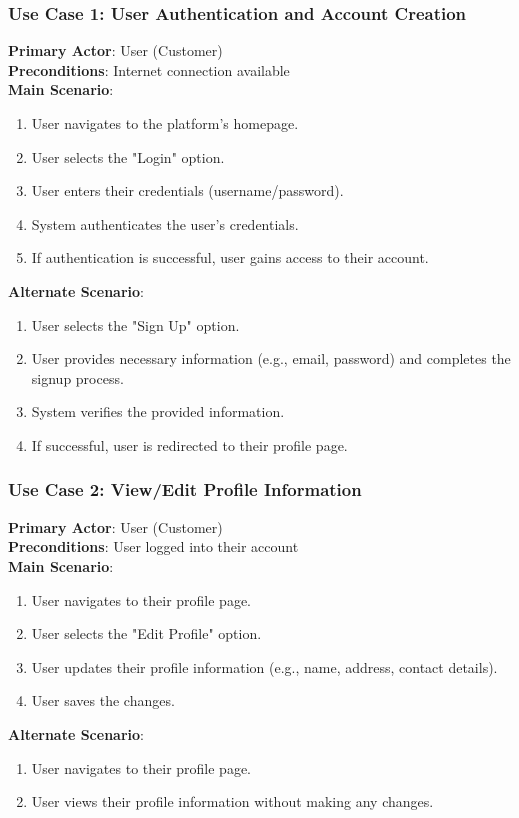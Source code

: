 \documentclass{article}
\begin{document}
\subsubsection{Use Case 1: User Authentication and Account Creation}
\textbf{Primary Actor}: User (Customer) \\
\textbf{Preconditions}: Internet connection available \\
\textbf{Main Scenario}:
\begin{enumerate}
    \item User navigates to the platform's homepage.
    \item User selects the "Login" option.
    \item User enters their credentials (username/password).
    \item System authenticates the user's credentials.
    \item If authentication is successful, user gains access to their account.
\end{enumerate}
\textbf{Alternate Scenario}:
\begin{enumerate}
    \item User selects the "Sign Up" option.
    \item User provides necessary information (e.g., email, password) and completes the signup process.
    \item System verifies the provided information.
    \item If successful, user is redirected to their profile page.
\end{enumerate}

\subsubsection{Use Case 2: View/Edit Profile Information}
\textbf{Primary Actor}: User (Customer) \\
\textbf{Preconditions}: User logged into their account \\
\textbf{Main Scenario}:
\begin{enumerate}
    \item User navigates to their profile page.
    \item User selects the "Edit Profile" option.
    \item User updates their profile information (e.g., name, address, contact details).
    \item User saves the changes.
\end{enumerate}
\textbf{Alternate Scenario}:
\begin{enumerate}
    \item User navigates to their profile page.
    \item User views their profile information without making any changes.
\end{enumerate}
\end{document}
